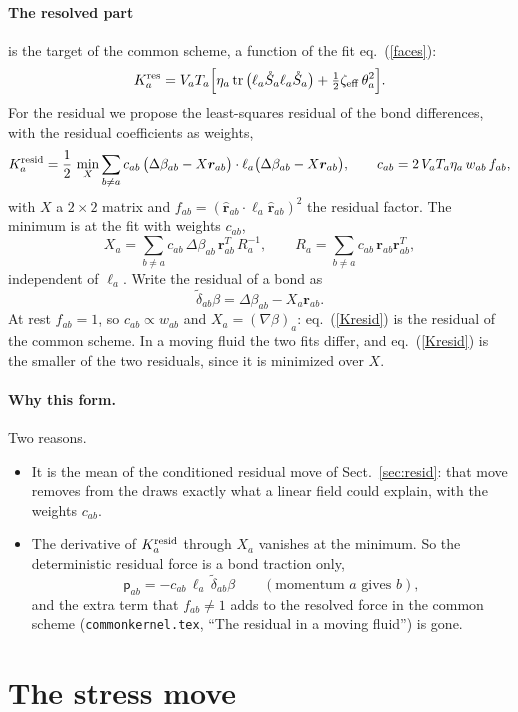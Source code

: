 \documentclass[11pt,aps,preprint,nofootinbib,superscriptaddress,tightenlines]{revtex4-2}
\newcommand{\pf}{\bm{\mathsf p}}
\def\st{\begin{equation}}
\def\stp{\end{equation}}
\def\Eq#1{eq.~(\ref{#1})}
\def\Sect#1{Sect.~\ref{#1}}
\def\tr{\operatorname{tr}}
\let\oldparagraph\paragraph
\renewcommand{\paragraph}{\par\bigskip\oldparagraph}
\begin{document}
\paragraph{The resolved part} is the target of the common scheme, a function of the fit \Eq{faces}:
\st
K_a^{\rm res}=V_aT_a\Big[\eta_a\tr\big(\ell_a\mathring S_a\ell_a\mathring S_a\big)+\tfrac12\zeta_{\rm eff}\,\theta_a^2\Big] .
\label{Kres}
\stp
For the residual we propose the least-squares residual of the bond differences, with the residual coefficients as weights,
\st
K_a^{\rm resid}=\frac12\,\min_{X}\sum_{b\neq a}c_{ab}\,\big(\Delta\beta_{ab}-X\bm r_{ab}\big)\cdot\ell_a\big(\Delta\beta_{ab}-X\bm r_{ab}\big),\qquad
c_{ab}=2\,V_aT_a\eta_a\,w_{ab}\,f_{ab} ,
\label{Kresid}
\stp
with $X$ a $2\times2$ matrix and $f_{ab}=(\hat{\bm r}_{ab}\cdot\ell_a\hat{\bm r}_{ab})^2$ the residual factor.  The minimum is at the fit with weights $c_{ab}$,
\st
X_a=\sum_{b\neq a}c_{ab}\,\Delta\beta_{ab}\,\bm r_{ab}^T\,R_a^{-1},\qquad R_a=\sum_{b\neq a}c_{ab}\,\bm r_{ab}\bm r_{ab}^T ,
\label{Xa}
\stp
independent of $\ell_a$.  Write the residual of a bond as
\st
\tilde\delta_{ab}\beta=\Delta\beta_{ab}-X_a\bm r_{ab} .
\stp
At rest $f_{ab}=1$, so $c_{ab}\propto w_{ab}$ and $X_a=(\nabla\beta)_a$: \Eq{Kresid} is the residual of the common scheme.  In a moving fluid
the two fits differ, and \Eq{Kresid} is the smaller of the two residuals, since it is minimized over $X$.

\paragraph{Why this form.}  Two reasons.
\begin{itemize}
\item It is the mean of the conditioned residual move of \Sect{sec:resid}: that move removes from the draws exactly what a linear
  field could explain, with the weights $c_{ab}$.
\item The derivative of $K_a^{\rm resid}$ through $X_a$ vanishes at the minimum.  So the deterministic residual force is a bond
  traction only,
  \st
  \pf_{ab}=-c_{ab}\,\ell_a\,\tilde\delta_{ab}\beta\qquad(\text{momentum }a\text{ gives }b),
  \stp
  and the extra term that $f_{ab}\neq1$ adds to the resolved force in the common scheme (\texttt{commonkernel.tex}, ``The residual in a moving
  fluid'') is gone.
\end{itemize}

\section{The stress move}
\label{sec:stress}
\end{document}
